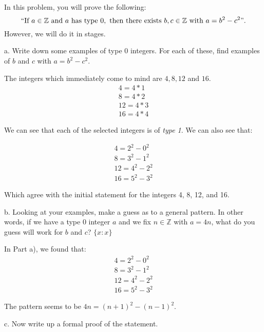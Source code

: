 \documentclass[12pt]{article}
\newenvironment{problem}[2][Problem]
{
	\begin{trivlist} 
		\item[\hskip \labelsep {\bfseries #1 #2:}]
	}
{
	\end{trivlist}
	}
\newenvironment{solution}[1][Solution]
{
	\begin{trivlist} 
		\item[\hskip \labelsep {\itshape #1:}]
	}
	{
	\end{trivlist}
}
\begin{document}
\begin{problem}{2}
	In this problem, you will prove the following:
	\[
	``\text{If } a \in \mathbb{Z} \text{ and } a \text{ has type } 0, \text{ then there exists } b,c \in \mathbb{Z} \text{ with } a = b^2 - c^2".
	\]
	However, we will do it in stages.
	
	\noindent
	a. Write down some examples of type $0$ integers.  For each of these, find examples of $b$ and $c$ with $a = b^2 - c^2$.
	\begin{solution}
	The integers which immediately come to mind are $4, 8 ,12$ and $16$.
	\begin{align*}
	4=4*1\\
	8=4*2\\
	12=4*3\\
	16=4*4
	\end{align*}
	
	We can see that each of the selected integers is of {\em type 1}. We can also see that:
	
	\begin{align*}
	4=2^2 - 0^2\\
	8=3^2 - 1^2 \\
	12=4^2 - 2^2\\
	16=5^2 - 3^2
	\end{align*}

	Which agree with the initial statement for the integers 4, 8, 12, and 16.
	
	\end{solution}
	
	\noindent
	b. Looking at your examples, make a guess as to a general pattern.  In other words, if we have a type $0$ integer $a$ and we fix $n \in \mathbb{Z}$ with $a = 4n$, what do you guess will work for $b$ and $c$? $\{x : x\}$
	\begin{solution}
	In Part a), we found that:
		\begin{align*}
	4=2^2 - 0^2\\
	8=3^2 - 1^2 \\
	12=4^2 - 2^2\\
	16=5^2 - 3^2
	\end{align*}
	
	The pattern seems to be $4n=(n+1)^2 - (n-1)^2$.
	\end{solution}

	\noindent
	c. Now write up a formal proof of the statement. \\
\end{problem}
\end{document}
